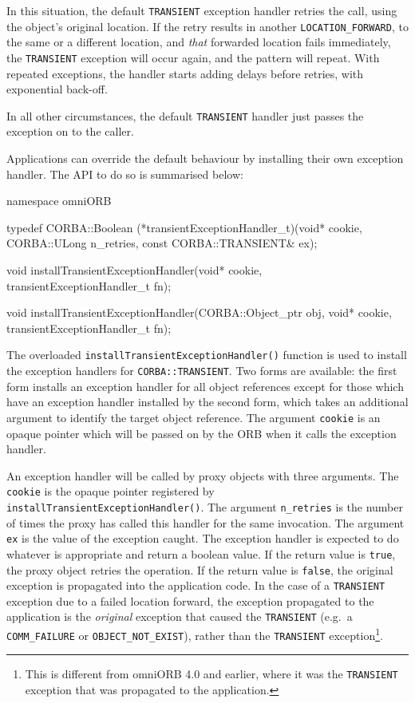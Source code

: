\documentclass[11pt,oneside,a4paper]{book}
\newcommand{\code}[1]{\texttt{#1}}
\newcommand{\op}[1]{\texttt{#1()}}
\newcommand{\dsc}{\discretionary{}{}{}}
\begin{document}
In this situation, the default \code{TRANSIENT} exception handler
retries the call, using the object's original location. If the retry
results in another \code{LOCATION\_\dsc{}FORWARD}, to the same or a
different location, and \emph{that} forwarded location fails
immediately, the \code{TRANSIENT} exception will occur again, and the
pattern will repeat. With repeated exceptions, the handler starts
adding delays before retries, with exponential back-off.

In all other circumstances, the default \code{TRANSIENT} handler just
passes the exception on to the caller.

Applications can override the default behaviour by installing their
own exception handler. The API to do so is summarised below:

\begin{cxxlisting}
namespace omniORB {
  
  typedef CORBA::Boolean 
  (*transientExceptionHandler_t)(void* cookie,
                                 CORBA::ULong n_retries,
                                 const CORBA::TRANSIENT& ex);

  void 
  installTransientExceptionHandler(void* cookie,
                                   transientExceptionHandler_t fn);

  void
  installTransientExceptionHandler(CORBA::Object_ptr obj,
                                   void* cookie,
                                   transientExceptionHandler_t fn);
}
\end{cxxlisting}

The overloaded \op{installTransientExceptionHandler} function is used
to install the exception handlers for \code{CORBA::TRANSIENT}.  Two
forms are available: the first form installs an exception handler for
all object references except for those which have an exception handler
installed by the second form, which takes an additional argument to
identify the target object reference. The argument \code{cookie} is an
opaque pointer which will be passed on by the ORB when it calls the
exception handler.

An exception handler will be called by proxy objects with three
arguments. The \code{cookie} is the opaque pointer registered by
\op{installTransientException\dsc{}Handler}. The argument
\code{n\_retries} is the number of times the proxy has called this
handler for the same invocation. The argument \code{ex} is the value
of the exception caught.  The exception handler is expected to do
whatever is appropriate and return a boolean value. If the return
value is \code{true}, the proxy object retries the operation. If the
return value is \code{false}, the original exception is propagated
into the application code. In the case of a \code{TRANSIENT} exception
due to a failed location forward, the exception propagated to the
application is the \emph{original} exception that caused the
\code{TRANSIENT} (e.g.\ a \code{COMM\_FAILURE} or
\code{OBJECT\_NOT\_EXIST}), rather than the \code{TRANSIENT}
exception\footnote{This is different from omniORB 4.0 and earlier,
  where it was the \code{TRANSIENT} exception that was propagated to
  the application.}.
\end{document}
